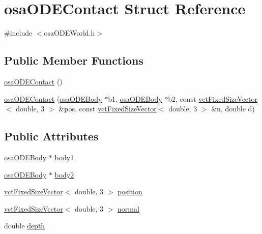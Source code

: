 \hypertarget{structosa_o_d_e_contact}{\section{osa\-O\-D\-E\-Contact Struct Reference}
\label{structosa_o_d_e_contact}
}


{\ttfamily \#include $<$osa\-O\-D\-E\-World.\-h$>$}

\subsection*{Public Member Functions}
\begin{DoxyCompactItemize}
\item 
\hyperlink{structosa_o_d_e_contact_a496088c6e01a52a546a30cc356ac3b5d}{osa\-O\-D\-E\-Contact} ()
\item 
\hyperlink{structosa_o_d_e_contact_ae349ddb20efea33d4f382e4bc73dbfb5}{osa\-O\-D\-E\-Contact} (\hyperlink{classosa_o_d_e_body}{osa\-O\-D\-E\-Body} $\ast$b1, \hyperlink{classosa_o_d_e_body}{osa\-O\-D\-E\-Body} $\ast$b2, const \hyperlink{classvct_fixed_size_vector}{vct\-Fixed\-Size\-Vector}$<$ double, 3 $>$ \&pos, const \hyperlink{classvct_fixed_size_vector}{vct\-Fixed\-Size\-Vector}$<$ double, 3 $>$ \&n, double d)
\end{DoxyCompactItemize}
\subsection*{Public Attributes}
\begin{DoxyCompactItemize}
\item 
\hyperlink{classosa_o_d_e_body}{osa\-O\-D\-E\-Body} $\ast$ \hyperlink{structosa_o_d_e_contact_ae89beddf59923facc7abce1c1f9ce2a8}{body1}
\item 
\hyperlink{classosa_o_d_e_body}{osa\-O\-D\-E\-Body} $\ast$ \hyperlink{structosa_o_d_e_contact_a1148b4a03a82bf9f7155b4e7a7536739}{body2}
\item 
\hyperlink{classvct_fixed_size_vector}{vct\-Fixed\-Size\-Vector}$<$ double, 3 $>$ \hyperlink{structosa_o_d_e_contact_aec71f90b8053631cb8d51b2eb375a266}{position}
\item 
\hyperlink{classvct_fixed_size_vector}{vct\-Fixed\-Size\-Vector}$<$ double, 3 $>$ \hyperlink{structosa_o_d_e_contact_a13e7c6b7b860f7b0744121d413929807}{normal}
\item 
double \hyperlink{structosa_o_d_e_contact_a6c133096ca9fd520047a636656c50126}{depth}
\end{DoxyCompactItemize}


